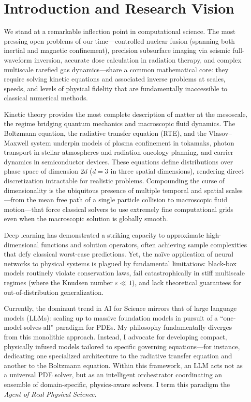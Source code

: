 \section{Introduction and Research Vision}

We stand at a remarkable inflection point in computational science.  The most
pressing open problems of our time---controlled nuclear fusion (spanning both
inertial and magnetic confinement), precision subsurface imaging via seismic
full-waveform inversion, accurate dose calculation in radiation therapy, and
complex multiscale rarefied gas dynamics---share a common mathematical core: they
require solving kinetic equations and associated inverse problems at scales,
speeds, and levels of physical fidelity that are fundamentally inaccessible to
classical numerical methods.

Kinetic theory provides the most complete description of matter at the
mesoscale, the regime bridging quantum mechanics and macroscopic fluid
dynamics.  The Boltzmann equation, the radiative transfer equation (RTE), and
the Vlasov--Maxwell system underpin models of plasma confinement in tokamaks,
photon transport in stellar atmospheres and radiation oncology planning, and
carrier dynamics in semiconductor devices.  These equations define
distributions over phase space of dimension $2d$ ($d = 3$ in three spatial
dimensions), rendering direct discretization intractable for realistic
problems.  Compounding the curse of dimensionality is the ubiquitous presence
of multiple temporal and spatial scales---from the mean free path of a single
particle collision to macroscopic fluid motion---that force classical solvers
to use extremely fine computational grids even when the macroscopic solution
is globally smooth.

Deep learning has demonstrated a striking capacity to approximate
high-dimensional functions and solution operators, often achieving sample
complexities that defy classical worst-case predictions.  Yet, the na\"{i}ve
application of neural networks to physical systems is plagued by fundamental
limitations: black-box models routinely violate conservation laws, fail
catastrophically in stiff multiscale regimes (where the Knudsen number
$\varepsilon \ll 1$), and lack theoretical guarantees for out-of-distribution
generalization.

Currently, the dominant trend in AI for Science mirrors that of large language
models (LLMs): scaling up to massive foundation models in pursuit of a
``one-model-solves-all'' paradigm for PDEs. My philosophy fundamentally diverges
from this monolithic approach. Instead, I advocate for developing compact,
physically infused models tailored to specific governing equations---for
instance, dedicating one specialized architecture to the radiative transfer
equation and another to the Boltzmann equation. Within this framework, an LLM
acts not as a universal PDE solver, but as an intelligent orchestrator
coordinating an ensemble of domain-specific, physics-aware solvers. I term
this paradigm the \emph{Agent of Real Physical Science}.

